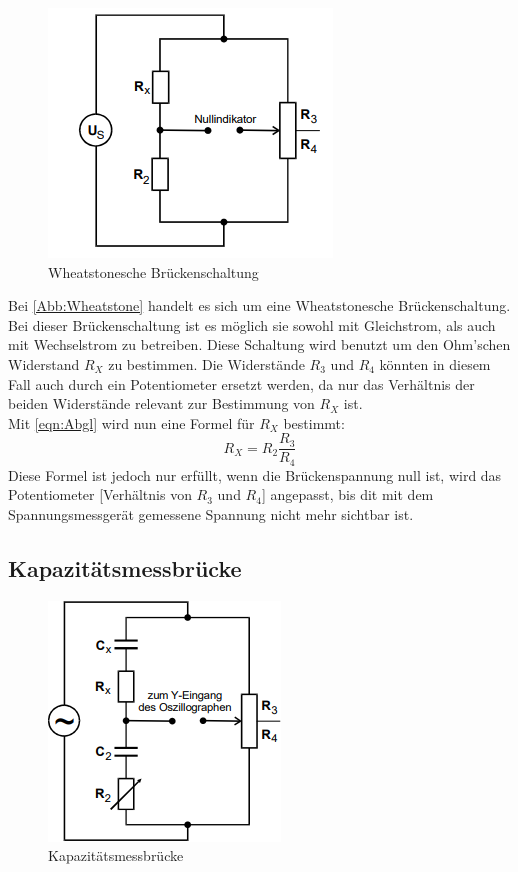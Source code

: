 \documentclass[
  bibliography=totoc,     %
  captions=tableheading,  %
  titlepage=firstiscover, %
]{scrartcl}
\begin{document}
  \begin{figure}
    \centering
    \includegraphics{Wheatstone.png}
    \caption{Wheatstonesche Brückenschaltung \cite{1}}
    \label{Abb:Wheatstone}
  \end{figure}

  Bei \autoref{Abb:Wheatstone} handelt es sich um eine Wheatstonesche Brückenschaltung. Bei dieser Brückenschaltung
  ist es möglich sie sowohl mit Gleichstrom, als auch mit Wechselstrom zu betreiben. Diese Schaltung wird benutzt um den
  Ohm'schen Widerstand $R_X$ zu bestimmen. Die Widerstände $R_3$ und $R_4$ könnten in diesem Fall auch durch ein Potentiometer
  ersetzt werden, da nur das Verhältnis der beiden Widerstände relevant zur Bestimmung von $R_X$ ist. \\

  Mit \autoref{eqn:Abgl} wird nun eine Formel für $R_X$ bestimmt:
  \begin{equation}
    R_X = R_2 \frac{R_3}{R_4} \label{eqn: RXW}
  \end{equation}
  Diese Formel ist jedoch nur erfüllt, wenn die Brückenspannung null ist, wird das Potentiometer [Verhältnis von $R_3$ und $R_4$]
  angepasst, bis dit mit dem Spannungsmessgerät gemessene Spannung nicht mehr sichtbar ist.

  \subsection{Kapazitätsmessbrücke}

  \begin{figure}
    \centering
    \includegraphics{Kapazitätsmessbrücke.png}
    \caption{Kapazitätsmessbrücke \cite{1}}
    \label{Abb: Kapazitaetsmessbruecke}
  \end{figure}
\end{document}

